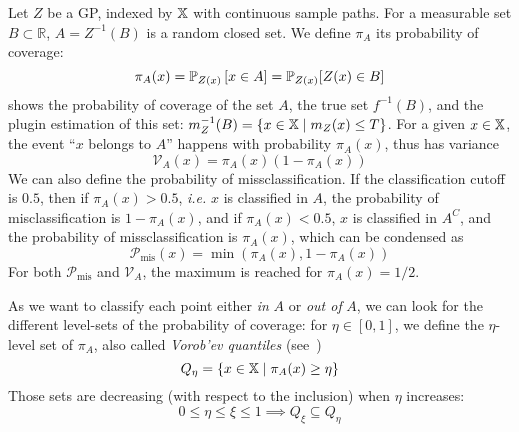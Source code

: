 \documentclass[../../Main_ManuscritThese.tex]{subfiles}
\begin{document}
Let $Z$ be a GP, indexed by $\mathbb{X}$ with continuous sample paths. For a measurable set $B\subset \mathbb{R}$, $A = Z^{-1}(B)$ is a random closed set.
We define $\pi_A$ its probability of coverage:
\begin{equation}
  \pi_A(x) = \mathbb{P}_{Z(x)}\left[x\in A\right] = \mathbb{P}_{Z(x)}[Z(x) \in B]
\end{equation}
 shows the probability of coverage of the set $A$, the true set $f^{-1}(B)$, and the plugin estimation of this set: $m_Z^{-1}(B) = \{x\in\mathbb{X} \mid m_Z(x) \leq T\}$.
For a given $x\in\mathbb{X}$, the event ``$x$ belongs to $A$'' happens with probability $\pi_A(x)$, thus has variance
\begin{equation}
\mathscr{V}_A(x)=\pi_A(x)(1 - \pi_A(x))
\end{equation}
We can also define the probability of missclassification. If the classification cutoff is $0.5$, then if $\pi_A(x) > 0.5$, \emph{i.e.} $x$ is classified in $A$, the probability of misclassification is $1-\pi_A(x)$, and if $\pi_A(x) < 0.5$, $x$ is classified in $A^{C}$, and the probability of missclassification is $\pi_A(x)$, which can be condensed as
\begin{equation}
\mathscr{P}_{\mathrm{mis}}(x) = \min(\pi_A(x), 1-\pi_A(x))
\end{equation}
For both $\mathscr{P}_{\mathrm{mis}}$ and $\mathscr{V}_A$, the maximum is reached for $\pi_A(x) = 1/2$.

As we want to classify each point either \emph{in} $A$ or \emph{out of} $A$, we can look for the different level-sets of the probability of coverage: for $\eta \in [0, 1]$, we define the $\eta$-level set of $\pi_A$, also called \emph{Vorob'ev quantiles} (see~\cite{vorobyev_new_2003})
\begin{equation}
  Q_{\eta} = \{x\in\mathbb{X} \mid \pi_A(x) \geq \eta \}
\end{equation}
Those sets are decreasing (with respect to the inclusion) when $\eta$ increases:
\begin{equation}
  0\leq \eta \leq \xi \leq 1 \implies Q_{\xi} \subseteq Q_{\eta}
\end{equation}
\end{document}
